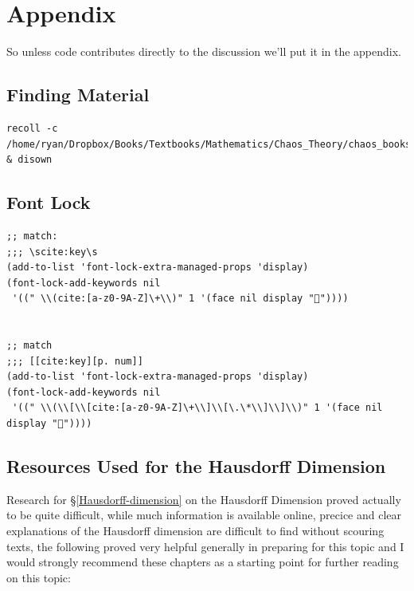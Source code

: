 \documentclass[11pt]{article}
\begin{document}
\section{Appendix}
\label{appendix}
So unless code contributes directly to the discussion we'll put it in the appendix.
\subsection{Finding Material}
\label{sec:orgf40070f}
\begin{verbatim}
recoll -c /home/ryan/Dropbox/Books/Textbooks/Mathematics/Chaos_Theory/chaos_books_recoll & disown
\end{verbatim}
\subsection{Font Lock}
\label{sec:org4d0319e}
\begin{verbatim}
;; match:
;;; \scite:key\s
(add-to-list 'font-lock-extra-managed-props 'display)
(font-lock-add-keywords nil
 '((" \\(cite:[a-z0-9A-Z]\+\\)" 1 '(face nil display "🤔"))))


;; match
;;; [[cite:key][p. num]]
(add-to-list 'font-lock-extra-managed-props 'display)
(font-lock-add-keywords nil
 '((" \\(\\[\\[cite:[a-z0-9A-Z]\+\\]\\[\.\*\\]\\]\\)" 1 '(face nil display "🤔"))))
\end{verbatim}
\subsection{Resources Used for the Hausdorff Dimension}
\label{haus-resource}
Research for \S \ref{Hausdorff-dimension} on the Hausdorff Dimension proved actually to be quite difficult, while much information is available online, precice and clear explanations of the Hausdorff dimension are difficult to find without scouring texts, the following proved very helpful generally in preparing for this topic and I would strongly recommend these chapters as a starting point for further reading on this topic:
\end{document}
